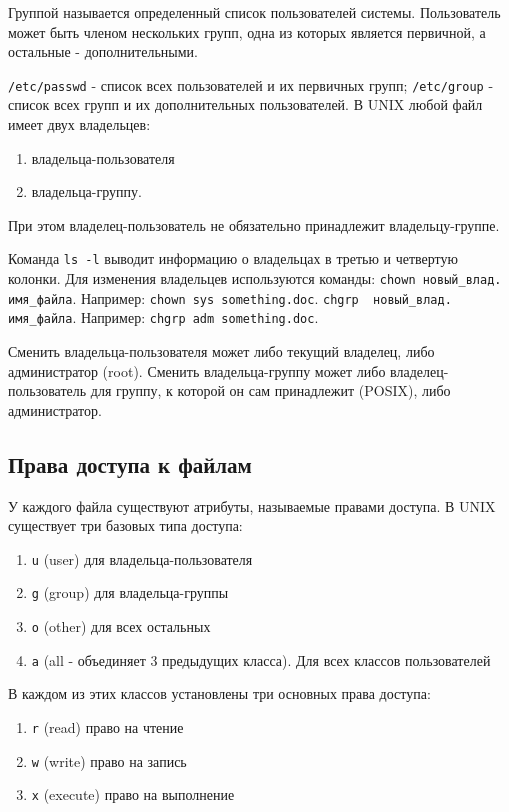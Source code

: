 Группой называется определенный список пользователей системы.
Пользователь может быть членом нескольких групп, одна из которых является первичной, а остальные - дополнительными.

\verb+/etc/passwd+ - список всех пользователей и их первичных групп;
\verb+/etc/group+ - список всех групп и их дополнительных пользователей.
В UNIX любой файл имеет двух владельцев:
\begin{enumerate}
\item владельца-пользователя
\item владельца-группу.
\end{enumerate}
При этом владелец-пользователь не обязательно принадлежит владельцу-группе. 

Команда \verb+ls -l+ выводит информацию о владельцах в третью и четвертую колонки. Для изменения владельцев используются команды:\newline
\verb+chown новый_влад. имя_файла+. Например: \verb+chown sys something.doc+.\newline
\verb+chgrp  новый_влад. имя_файла+. Например: \verb+chgrp adm something.doc+.

Сменить владельца-пользователя может либо текущий владелец, либо администратор (root). Сменить владельца-группу может либо владелец-пользователь для группу, к которой он сам принадлежит (POSIX), либо администратор.

\subsection{Права доступа к файлам}

У каждого файла существуют атрибуты, называемые правами доступа.
В UNIX существует три базовых типа доступа:
\begin{enumerate}
\item 	\verb+u+ (user) для владельца-пользователя
\item 	\verb+g+ (group) для владельца-группы         
\item  	\verb+o+ (other) для всех остальных 
\item 	\verb+а+ (all - объединяет 3 предыдущих класса). Для всех классов пользователей
\end{enumerate}

В каждом из этих классов установлены три основных права доступа:
\begin{enumerate}
 \item \verb+r+ (read) право на чтение           
 \item \verb+w+ (write) право на запись           
 \item \verb+x+ (execute) право на выполнение  
\end{enumerate}

